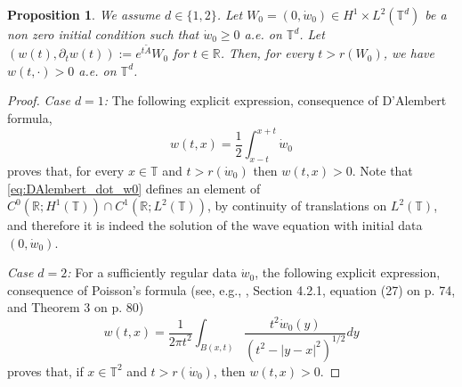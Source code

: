 \documentclass[a4paper]{article}
\theoremstyle{plain}
\newtheorem{proposition}[theorem]{Proposition}
\newcommand{\T}{\mathbb{T}}
\newcommand{\R}{\mathbb{R}}
\begin{document}
\begin{proposition} \label{Lem:signe}
We assume $d \in \{1,2\}$. Let $W_0=(0,\dot{w}_0) \in H^1 \times L^2(\T^d)$ be a non zero initial condition such that 
$\dot{w}_0 \geq 0$ a.e. on $\T^d$. Let $(w(t),\partial_t w(t)):=e^{t\widetilde{A}}W_0$ for $t \in \R$. Then, for every $t>r(W_0)$, we have $w(t,\cdot)>0$ a.e. on  $\T^d$.
\end{proposition} 



\begin{proof}
\noindent \emph{Case $d=1$:} The following explicit expression, consequence of D'Alembert formula,
\begin{equation}\label{eq:DAlembert_dot_w0}
w(t,x)=\frac{1}{2}\int_{x-t}^{x+t} \dot{w}_0 
\end{equation}
proves that, for every $x \in\T$ and $t>r(\dot{w}_0)$ then $w(t,x)>0$. Note that \eqref{eq:DAlembert_dot_w0} defines an element of $C^0(\R; H^1(\T)) \cap C^1(\R; L^2(\T))$, by continuity of translations on $L^2(\T)$, and therefore it is indeed the solution of the wave equation with initial data $(0, \dot{w}_0)$.

\medskip

\noindent \emph{Case $d=2$:} For a sufficiently regular data $\dot{w}_0$, the following explicit expression, consequence of Poisson's formula (see, e.g., \cite{evans-book}, Section 4.2.1, equation (27) on p. 74, and Theorem 3 on p. 80) 
\begin{equation}\label{eq:proof:Lem:signe:1}
w(t,x)=\frac{1}{2\pi t^2} \int_{B(x,t)}
\frac{t^2\dot{w}_0(y)}{(t^2-|y-x|^2)^{1/2}} dy    
\end{equation}
proves that, if $x \in\T^2$ and $t>r(\dot{w}_0)$, then $w(t,x)>0$.


\end{proof}
\end{document}
